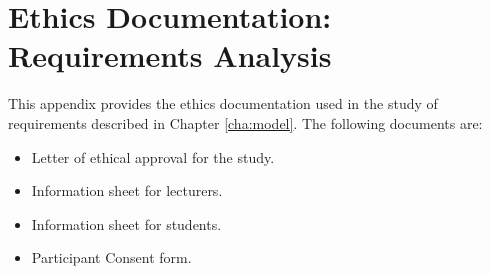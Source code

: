 \chapter{Ethics Documentation: Requirements Analysis}

This appendix provides the ethics documentation used in the study of \LLLs
requirements described in Chapter \ref{cha:model}. The following documents are:

\begin{itemize}
  \item Letter of ethical approval for the study.
  \item Information sheet for lecturers.
  \item Information sheet for students.
  \item Participant Consent form.
\end{itemize}










